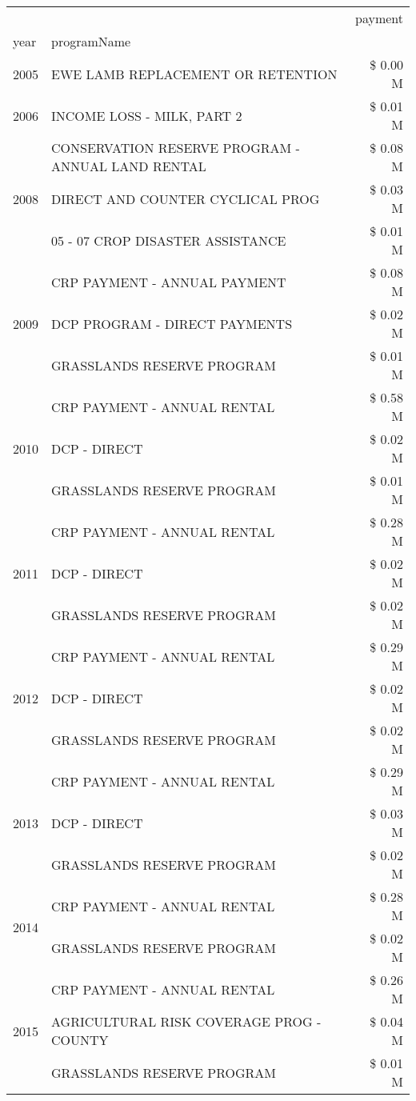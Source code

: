 \begin{tabular}{llr}
\toprule
 &  & payment \\
year & programName &  \\
\midrule
2005 & EWE LAMB REPLACEMENT OR RETENTION & \$ 0.00 M \\
\cline{1-3}
2006 & INCOME LOSS - MILK, PART 2 & \$ 0.01 M \\
\cline{1-3}
\multirow[t]{3}{*}{2008} & CONSERVATION RESERVE PROGRAM - ANNUAL LAND RENTAL & \$ 0.08 M \\
 & DIRECT AND COUNTER CYCLICAL PROG & \$ 0.03 M \\
 & 05 - 07 CROP DISASTER ASSISTANCE & \$ 0.01 M \\
\cline{1-3}
\multirow[t]{3}{*}{2009} & CRP PAYMENT - ANNUAL PAYMENT & \$ 0.08 M \\
 & DCP PROGRAM - DIRECT PAYMENTS & \$ 0.02 M \\
 & GRASSLANDS RESERVE PROGRAM & \$ 0.01 M \\
\cline{1-3}
\multirow[t]{3}{*}{2010} & CRP PAYMENT - ANNUAL RENTAL & \$ 0.58 M \\
 & DCP - DIRECT & \$ 0.02 M \\
 & GRASSLANDS RESERVE PROGRAM & \$ 0.01 M \\
\cline{1-3}
\multirow[t]{3}{*}{2011} & CRP PAYMENT - ANNUAL RENTAL & \$ 0.28 M \\
 & DCP - DIRECT & \$ 0.02 M \\
 & GRASSLANDS RESERVE PROGRAM & \$ 0.02 M \\
\cline{1-3}
\multirow[t]{3}{*}{2012} & CRP PAYMENT - ANNUAL RENTAL & \$ 0.29 M \\
 & DCP - DIRECT & \$ 0.02 M \\
 & GRASSLANDS RESERVE PROGRAM & \$ 0.02 M \\
\cline{1-3}
\multirow[t]{3}{*}{2013} & CRP PAYMENT - ANNUAL RENTAL & \$ 0.29 M \\
 & DCP - DIRECT & \$ 0.03 M \\
 & GRASSLANDS RESERVE PROGRAM & \$ 0.02 M \\
\cline{1-3}
\multirow[t]{2}{*}{2014} & CRP PAYMENT - ANNUAL RENTAL & \$ 0.28 M \\
 & GRASSLANDS RESERVE PROGRAM & \$ 0.02 M \\
\cline{1-3}
\multirow[t]{3}{*}{2015} & CRP PAYMENT - ANNUAL RENTAL & \$ 0.26 M \\
 & AGRICULTURAL RISK COVERAGE PROG - COUNTY & \$ 0.04 M \\
 & GRASSLANDS RESERVE PROGRAM & \$ 0.01 M \\

\end{tabular}
